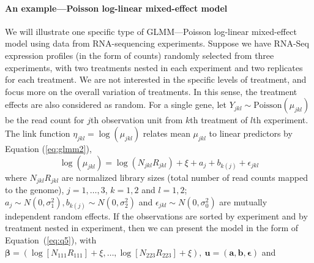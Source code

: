 \paragraph{An example---Poisson log-linear mixed-effect model}\label{poisson} 
We will illustrate one specific type of GLMM---Poisson log-linear mixed-effect model using data
from RNA-sequencing experiments. Suppose we have RNA-Seq expression profiles (in the form of counts)
randomly selected from three experiments, with two treatments nested in each experiment and two
replicates for each treatment. We are not interested in the specific levels of treatment, and focus
more on the overall variation of treatments. In this sense, the treatment effects are also
considered as random. For a single gene, let $Y_{jkl}\sim \text{Poisson}(\mu_{jkl})$ be the read
count for $j$th observation unit from $k$th treatment of $l$th experiment. The link function
$\eta_{jkl} = \log (\mu_{jkl})$ relates mean $\mu_{jkl}$ to linear predictors by Equation
(\ref{eq:glmm2}),  
\begin{equation}\label{eq:example}
\log (\mu_{jkl}) = \log (N_{jkl}R_{jkl}) + \xi + a_{j} + b_{k(j)} + \epsilon_{jkl}
\end{equation}
where $N_{jkl}R_{jkl}$ are normalized library sizes (total number of read counts mapped to the
genome),  $j=1, \ldots,  3$, $k=1, 2$ and $l=1, 2$; $a_j \sim N(0, \sigma_1^2), b_{k(j)}\sim N(0,
\sigma_2^2)$ and $\epsilon_{jkl}\sim N(0, \sigma_0^2)$ are mutually independent random effects. If
the observations are sorted by experiment and by treatment nested in experiment, then we can present
the model in the form of Equation~(\ref{eq:q5}), with  $\bm \beta = (\log [N_{111}R_{111}]  +
\xi,\ldots, \log [N_{223}R_{223}]  + \xi), ~\bm u = (\bm a, \bm b, \bm \epsilon)$ and 
